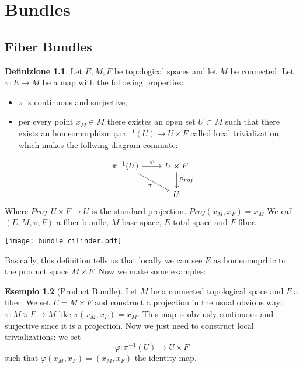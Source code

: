 \documentclass[12pt,a4paper]{report}
\theoremstyle{definition}
\newtheorem{Def}{Definizione}[chapter]
\theoremstyle{Theorem}
\theoremstyle{definition}
\newtheorem{Ex}[Def]{Esempio}
\theoremstyle{definition}
\theoremstyle{definition}
\begin{document}
	\chapter{Bundles}
	\section{Fiber Bundles}
	\begin{Def} \label{Def_5.1}
		Let $E,M,F$ be topological spaces and let $M$ be connected. Let $\pi:E\rightarrow M$ be a map with the following properties:
		\begin{itemize}
			\item $\pi$ is continuous and surjective;
			\item per every point $x_M\in M$ there existes an open set $U\subset M$ such that there exists an homeomorphism $\varphi:\pi^{-1}(U)\rightarrow U\times F$ called local trivialization, which makes the follwing diagram commute:
		\end{itemize}
		\[
		\begin{tikzcd}
			\pi^{-1}(U) \arrow{r}{\varphi} \arrow[swap]{dr}{\pi} & U\times F \arrow{d}{Proj}\\
			& U 
		\end{tikzcd}
		\]
		Where $Proj: U\times F\rightarrow U$ is the standard projection. $Proj(x_M,x_F)=x_M$
		We call $(E,M,\pi,F)$ a fiber bundle, $M$ base space, $E$ total space and $F$ fiber.
	\end{Def}
	\begin{center}
		\texttt{[image: bundle\_cilinder.pdf]}
	\end{center}
	Basically, this definition tells us that locally we can see $E$ as homeomoprhic to the product space $M\times F$. Now we make some examples:
	\begin{Ex}[Product Bundle]\label{Ex_5.1}
		Let $M$ be a connected topological space and $F$ a fiber. We set $E=M\times F$ and construct a projection in the usual obvious way:\\ $\pi:M\times F\rightarrow M$ like $\pi(x_M,x_F)=x_M$. This map is obviusly continuous and surjective since it is a projection. Now we just need to construct local trivializations: we set
		$$\varphi:\pi^{-1}(U)\rightarrow U\times F$$
		such that $\varphi(x_M,x_F)=(x_M,x_F)$ the identity map.
	\end{Ex}
\end{document}
